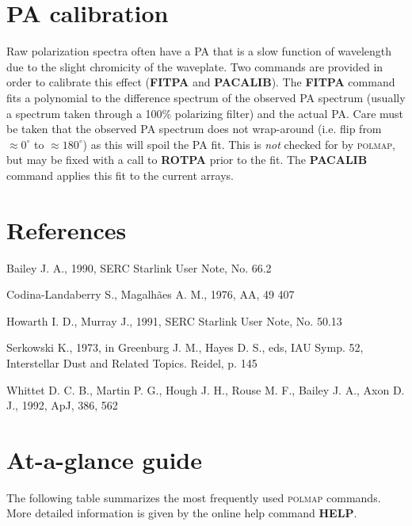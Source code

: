 \documentclass[11pt,nolof,noabs]{starlink}
\begin{document}
\section{PA calibration}

Raw polarization spectra often have a PA that is a slow function of
wavelength due to the slight chromicity of the waveplate. Two commands
are provided in order to calibrate this effect (\textbf{FITPA} and \textbf{PACALIB}). The \textbf{FITPA} command fits a polynomial to the difference
spectrum of the observed PA spectrum (usually a spectrum taken through
a 100\% polarizing filter) and the actual PA.  Care must be taken
that the observed PA spectrum does not wrap-around (i.e. flip from
$\approx0^\circ$ to $\approx180^\circ$) as this will spoil the PA
fit. This is \emph{not} checked for by \textsc{polmap}, but may be fixed with a
call to \textbf{ROTPA} prior to the fit. The \textbf{PACALIB}
command applies this fit to the current arrays.

\section{References}

Bailey J. A., 1990, SERC Starlink User Note, No. 66.2

Codina-Landaberry S., Magalh\~{a}es A. M., 1976, AA, 49 407

Howarth I. D., Murray J., 1991, SERC Starlink User Note, No. 50.13

Serkowski K., 1973, in Greenburg J. M., Hayes D. S., eds, IAU Symp. 52,
Interstellar Dust and Related Topics. Reidel, p. 145

Whittet D. C. B., Martin P. G., Hough J. H., Rouse M. F., Bailey J. A.,
Axon D. J., 1992, ApJ, 386, 562

\appendix
\newpage
\section{At-a-glance guide}

The following table summarizes the most frequently used \textsc{polmap}
commands. More detailed information is given by the online help
command \textbf{HELP}.
\end{document}
